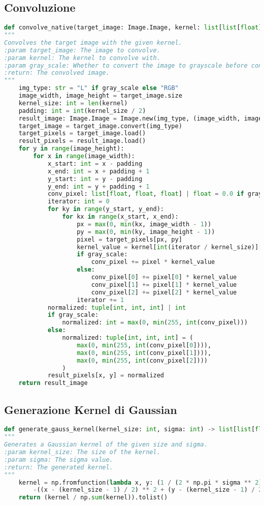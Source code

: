 {\subsection{Convoluzione}
{\begin{lstlisting}[language=Python, caption={Codice per la convoluzione}, label={appendix:convolution}]
def convolve_native(target_image: Image.Image, kernel: list[list[float]], gray_scale: bool = False) -> Image.Image:
"""
Convolves the target image with the given kernel.
:param target_image: The image to convolve.
:param kernel: The kernel to convolve with.
:param gray_scale: Whether to convert the image to grayscale before convolving.
:return: The convolved image.
"""
	img_type: str = "L" if gray_scale else "RGB"
	image_width, image_height = target_image.size
	kernel_size: int = len(kernel)
	padding: int = int(kernel_size / 2)
	result_image: Image.Image = Image.new(img_type, (image_width, image_height))
	target_image = target_image.convert(img_type)
	target_pixels = target_image.load()
	result_pixels = result_image.load()
	for y in range(image_height):
		for x in range(image_width):
			x_start: int = x - padding
			x_end: int = x + padding + 1
			y_start: int = y - padding
			y_end: int = y + padding + 1
			conv_pixel: list[float, float, float] | float = 0.0 if gray_scale else [0, 0, 0]
			iterator: int = 0
			for ky in range(y_start, y_end):
				for kx in range(x_start, x_end):
					px = max(0, min(kx, image_width - 1))
					py = max(0, min(ky, image_height - 1))
					pixel = target_pixels[px, py]
					kernel_value = kernel[int(iterator / kernel_size)][iterator % kernel_size]
					if gray_scale:
						conv_pixel += pixel * kernel_value
					else:
						conv_pixel[0] += pixel[0] * kernel_value
						conv_pixel[1] += pixel[1] * kernel_value
						conv_pixel[2] += pixel[2] * kernel_value
					iterator += 1
			normalized: tuple[int, int, int] | int
			if gray_scale:
				normalized: int = max(0, min(255, int(conv_pixel)))
			else:
				normalized: tuple[int, int, int] = (
					max(0, min(255, int(conv_pixel[0]))),
					max(0, min(255, int(conv_pixel[1]))),
					max(0, min(255, int(conv_pixel[2])))
				)
			result_pixels[x, y] = normalized
	return result_image
\end{lstlisting}}
\newpage
\subsection{Generazione Kernel di Gaussian}
{\begin{lstlisting}[language=Python, caption={Codice per la generazione di un kernel di Gauss}, label={appendix:gauss}]
def generate_gauss_kernel(kernel_size: int, sigma: int) -> list[list[float]]:
"""
Generates a Gaussian kernel of the given size and sigma.
:param kernel_size: The size of the kernel.
:param sigma: The sigma value.
:return: The generated kernel.
"""
	kernel = np.fromfunction(lambda x, y: (1 / (2 * np.pi * sigma ** 2)) * np.exp(
		-((x - (kernel_size - 1) / 2) ** 2 + (y - (kernel_size - 1) / 2) ** 2) / (2 * sigma ** 2)), (kernel_size, kernel_size))
	return (kernel / np.sum(kernel)).tolist()
\end{lstlisting}}

}
